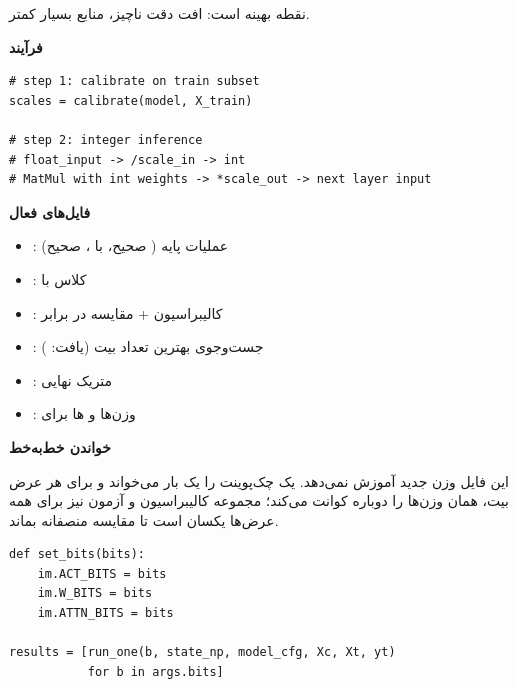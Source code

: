 \documentclass{article}
\newcommand{\mysubsection}[1]{
\par\vspace{0.5cm}
\noindent\textcolor{main_blue}{\large\textbf{#1}}
\par\vspace{0.2cm}
}
\begin{document}
 نقطه بهینه است: افت دقت ناچیز، منابع  بسیار کمتر.

\mysubsection{فرآیند}

\begin{latin}
\begin{lstlisting}
# step 1: calibrate on train subset
scales = calibrate(model, X_train)

# step 2: integer inference
# float_input -> /scale_in -> int
# MatMul with int weights -> *scale_out -> next layer input
\end{lstlisting}
\end{latin}

\mysubsection{فایل‌های فعال}

\begin{itemize}
\item {}: عملیات پایه ( صحیح،  با ،  صحیح)
\item {}: کلاس  با 
\item {}: کالیبراسیون + مقایسه  در برابر 
\item {}: جست‌وجوی بهترین تعداد بیت (یافت: )
\item {}: متریک نهایی 
\item {}:  وزن‌ها و ها برای 
\end{itemize}

\mysubsection{خواندن  خط‌به‌خط}

این فایل وزن جدید آموزش نمی‌دهد. یک چک‌پوینت  را یک بار می‌خواند و برای هر
عرض بیت، همان وزن‌ها را دوباره کوانت می‌کند؛ مجموعه کالیبراسیون و آزمون نیز برای همه
عرض‌ها یکسان است تا مقایسه منصفانه بماند.

\begin{latin}
\begin{lstlisting}
def set_bits(bits):
    im.ACT_BITS = bits
    im.W_BITS = bits
    im.ATTN_BITS = bits

results = [run_one(b, state_np, model_cfg, Xc, Xt, yt)
           for b in args.bits]
\end{lstlisting}
\end{latin}
\end{document}
